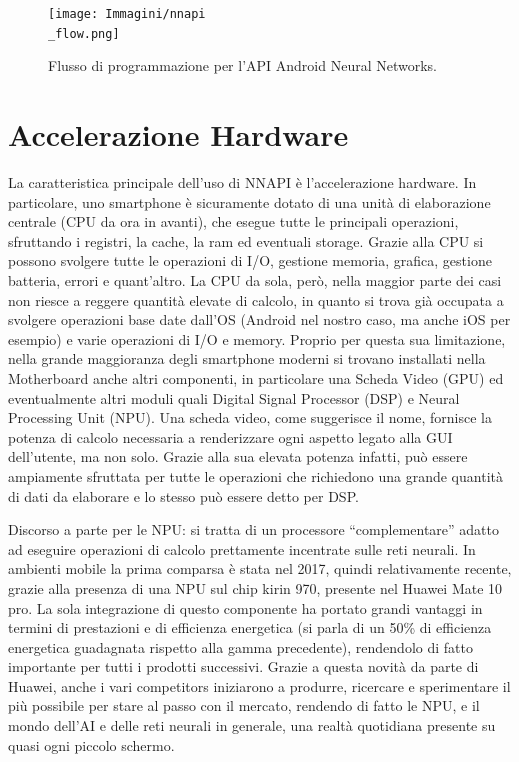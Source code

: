 \begin{figure}[ht]
    \centering
    \texttt{[image: Immagini/nnapi\\\_flow.png]}
    \caption{Flusso di programmazione per l'API Android Neural Networks.}
    \label{}
\end{figure}



\section{Accelerazione Hardware}
La caratteristica principale dell’uso di NNAPI\cite{NNAPI} è l’accelerazione hardware. In particolare, uno smartphone è sicuramente dotato di una unità di elaborazione
centrale (CPU da ora in avanti), che esegue tutte le principali operazioni, sfruttando i registri, la cache, la ram ed eventuali storage. Grazie alla CPU
si possono svolgere tutte le operazioni di I/O, gestione memoria, grafica, gestione batteria, errori e quant’altro.
La CPU da sola, però, nella maggior parte dei casi non riesce a reggere quantità elevate di calcolo, in quanto si trova già occupata a svolgere operazioni
base date dall’OS (Android nel nostro caso, ma anche iOS per esempio) e varie operazioni di I/O e memory. Proprio per questa sua limitazione, nella grande
maggioranza degli smartphone moderni si trovano installati nella Motherboard anche altri componenti, in particolare una Scheda Video (GPU) ed eventualmente
altri moduli quali Digital Signal Processor (DSP) e Neural Processing Unit (NPU). 
Una scheda video, come suggerisce il nome, fornisce la potenza di calcolo necessaria a renderizzare ogni aspetto legato alla GUI dell’utente, ma non solo.
Grazie alla sua elevata potenza infatti, può essere ampiamente sfruttata per tutte le operazioni che richiedono una grande quantità di dati da elaborare e
lo stesso può essere detto per DSP. 

Discorso a parte per le NPU: si tratta di un processore “complementare” adatto ad eseguire operazioni di calcolo prettamente incentrate sulle reti neurali.
In ambienti mobile la prima comparsa è stata nel 2017, quindi relativamente recente, grazie alla presenza di una NPU sul chip kirin 970, presente nel Huawei
Mate 10 pro.
La sola integrazione di questo componente ha portato grandi vantaggi in termini di prestazioni e di efficienza energetica (si parla di un 50\% di efficienza
energetica guadagnata rispetto alla gamma precedente), rendendolo di fatto importante per tutti i prodotti successivi. Grazie a questa novità da parte di
Huawei, anche i vari competitors iniziarono a produrre, ricercare e sperimentare il più possibile per stare al passo con il mercato, rendendo di fatto le NPU,
e il mondo dell’AI e delle reti neurali in generale, una realtà quotidiana presente su quasi ogni piccolo schermo.

